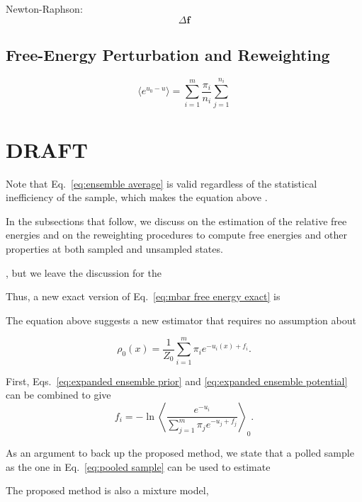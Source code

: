 \documentclass[aip,jcp,reprint,amsmath,amssymb]{revtex4-1}
\newcommand{\vt}[1]{\boldsymbol{\mathbf{#1}}}           %
\begin{document}
Newton-Raphson:
\begin{equation*}
\Delta \vt f
\end{equation*}


\subsection{Free-Energy Perturbation and Reweighting}

\begin{equation*}
\langle e^{u_0 - u} \rangle = \sum_{i=1}^m \frac{\pi_i}{n_i}\sum_{j=1}^{n_i} 
\end{equation*}

\section{DRAFT}

Note that Eq.~\eqref{eq:ensemble average} is valid regardless of the statistical inefficiency of the sample, which makes the equation above .


In the subsections that follow, we discuss on the estimation of the relative free energies and on the reweighting procedures to compute free energies and other properties at both sampled and unsampled states.


, but we leave the discussion for the 




Thus, a new exact version of Eq.~\eqref{eq:mbar free energy exact} is

The equation above suggests a new estimator that requires no assumption about 


\begin{equation}
\rho_0(x) = \frac{1}{Z_0} \sum_{i=1}^m \pi_i e^{-u_i(x) + f_i}.
\end{equation}



First, Eqs.~\eqref{eq:expanded ensemble prior} and \eqref{eq:expanded ensemble potential} can be combined to give
\begin{equation}
\label{eq:mblock potential}
f_i = -\ln \left\langle \frac{e^{-u_i}}{\sum_{j=1}^m \pi_j e^{-u_j + f_j}} \right\rangle_0.
\end{equation}



As an argument to back up the proposed method, we state that a polled sample as the one in Eq.~\eqref{eq:pooled sample} can be used to estimate 

The proposed method is also a mixture model,  
\end{document}
